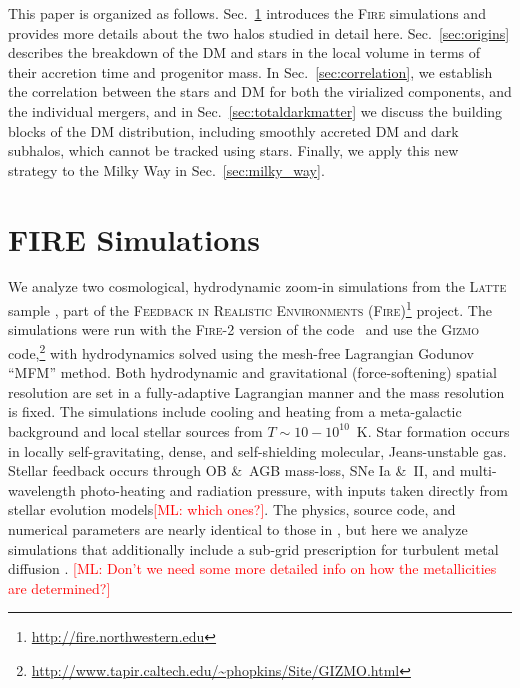 \documentclass[twocolumn,preprintnumbers]{aastex6}
\DeclareRobustCommand{\Sec}[1]{Sec.~\ref{#1}}
\def\ML#1{\textcolor{red}{[ML: #1]}}
\begin{document}
This paper is organized as follows. Sec.~\ref{sec:fire} introduces the \textsc{Fire} simulations and provides more details about the two halos studied in detail here.  Sec.~\ref{sec:origins} describes the breakdown of the DM and stars in the local volume in terms of their accretion time and progenitor mass. In \Sec{sec:correlation}, we establish the correlation between the stars and DM for both the virialized components, and the individual mergers, and in \Sec{sec:totaldarkmatter} we discuss the building blocks of the DM distribution, including smoothly accreted DM and dark subhalos, which cannot be tracked using stars. Finally, we apply this new strategy to the Milky Way in \Sec{sec:milky_way}.




\section{FIRE Simulations}
\label{sec:fire}

We analyze two cosmological, hydrodynamic zoom-in simulations \citep{KatzWhite1993,Onorbe2014} from the \textsc{Latte} sample \citep{Wetzel2016}, part of the \textsc{Feedback in Realistic Environments} (\textsc{Fire})\footnote{\url{http://fire.northwestern.edu}} project.  The simulations were run with the \textsc{Fire-2} version of the code~\cite{2017arXiv170206148H} and use the \textsc{Gizmo} \citep{Hopkins:2014qka} code,\footnote{\url{http://www.tapir.caltech.edu/~phopkins/Site/GIZMO.html}} with hydrodynamics solved using the mesh-free Lagrangian Godunov ``MFM'' method. Both hydrodynamic and gravitational (force-softening) spatial resolution are set in a fully-adaptive Lagrangian manner and the mass resolution is fixed. The simulations include cooling and heating from a meta-galactic background and local stellar sources from $T\sim10-10^{10}$~K.  Star formation occurs in locally self-gravitating, dense,  and self-shielding molecular, Jeans-unstable gas.  Stellar feedback occurs through OB \&\ AGB mass-loss, SNe Ia \&\ II, and multi-wavelength photo-heating and radiation pressure, with inputs taken directly from stellar evolution models\ML{which ones?}. The physics, source code, and numerical parameters are nearly identical to those in \citet{2017arXiv170206148H}, but here we analyze simulations that additionally include a sub-grid prescription for turbulent metal diffusion \citep{2017arXiv170206148H,Escala2017}.  \ML{Don't we need some more detailed info on how the metallicities are determined?}
\end{document}

